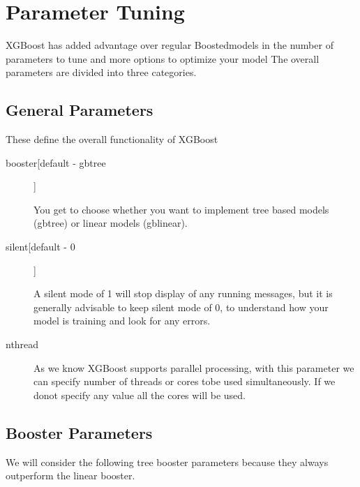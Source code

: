 \section{Parameter Tuning} 

XGBoost has added advantage over regular Boostedmodels in the number of
parameters  to tune and more options to optimize your model The overall
parameters are divided  into three categories.

\subsection{General Parameters}

These define the overall functionality of XGBoost

\begin{description}

\item[booster[default - gbtree]]

You get to choose whether you want to implement tree based models (gbtree) or
linear  models (gblinear).

\item[silent[default - 0]]

A silent mode of 1 will stop display of any running messages, but it is
generally  advisable to keep silent mode of 0, to understand how your model is
training and  look for any errors.

\item[nthread]

As we know XGBoost supports parallel processing, with this parameter we can
specify number of threads or cores tobe used simultaneously. If we donot 
specify any value  all the cores will be used.

\end{description}

\subsection{Booster Parameters} 

We will consider the following tree booster parameters because they always
outperform  the linear booster.

